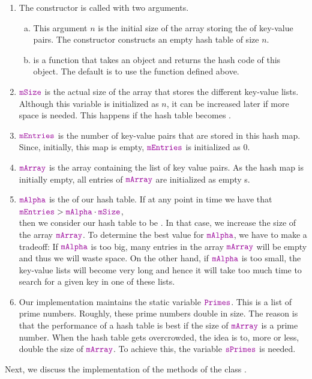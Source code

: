 \begin{enumerate}
\item The constructor  is called with two arguments.
      \begin{enumerate}[(a)]
      \item This argument $n$ is the initial size of the array storing the  of key-value
            pairs.  The constructor constructs an empty hash table of size $n$.
      \item {} is a function that takes an object and returns the hash code of this object.
            The default is to use the function  defined above.
      \end{enumerate}
\item $\mytt{mSize}$ is the actual size of the array that stores the different key-value lists.
      Although this variable is initialized as $n$, it can be increased later if more space is needed.  This happens 
      if the hash table becomes .
\item $\mytt{mEntries}$ is the number of key-value pairs that are stored in this hash map.
      Since, initially, this map is empty, $\mytt{mEntries}$ is  initialized as $0$.
\item $\mytt{mArray}$ is the array containing the list of key value pairs.
      As the hash map is initially empty, all entries of $\mytt{mArray}$ are initialized as empty s.
\item $\mytt{mAlpha}$ is the  of our hash table.  If at any point in time we have that
      \\[0.2cm]
      \hspace*{1.3cm}
      $\mytt{mEntries} > \mytt{mAlpha} \cdot \mytt{mSize}$,
      \\[0.2cm]
      then we consider our hash table to be .  In that case, we increase the size
      of the array $\mytt{mArray}$.  To determine the best value for $\mytt{mAlpha}$, we have to
      make a tradeoff:  If $\mytt{mAlpha}$ is too big, many entries in the array $\mytt{mArray}$
      will be empty and thus we will waste space.  On the other hand, if $\mytt{mAlpha}$ is too
      small, the key-value lists will become very long and hence it will take too much time to
      search for a given key in one of these lists.
\item Our implementation maintains the static variable $\mytt{Primes}$.  This is a list of prime numbers.
      Roughly, these prime numbers double in size.   
      The reason is that the performance of a hash table is best if the size of $\mytt{mArray}$ is a
      prime number.  When the hash table gets overcrowded, the idea is to, more or less, double
      the size of $\mytt{mArray}$.  To achieve this, the variable $\mytt{sPrimes}$ is needed.
\end{enumerate}
Next, we discuss the implementation of the  methods of the class .

